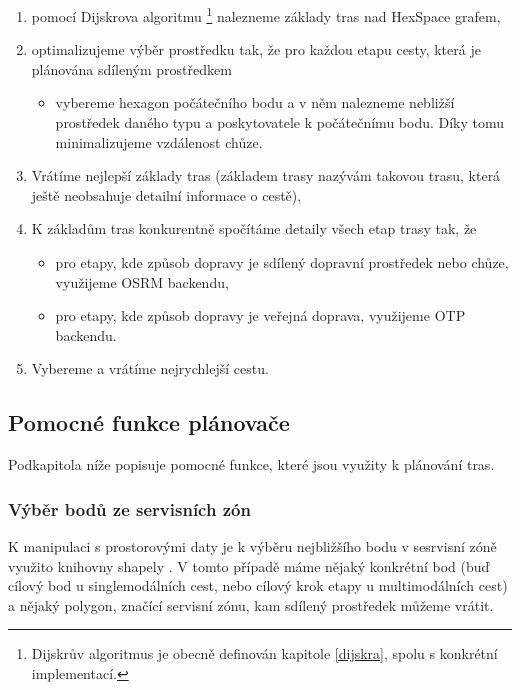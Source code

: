 \documentclass[thesis=M,czech]{FITthesis}[2019/12/23]
\theoremstyle{plain}
\theoremstyle{definition}
\begin{document}
\begin{enumerate}
	\item pomocí Dijskrova algoritmu \footnote{Dijskrův algoritmus je obecně definován kapitole \ref{dijskra}, spolu s konkrétní implementací.} nalezneme základy tras nad HexSpace grafem,

	\item optimalizujeme výběr prostředku tak, že pro každou etapu cesty, která je plánována sdíleným prostředkem
	\begin{itemize}
		\item vybereme hexagon počátečního bodu a v něm nalezneme nebližší prostředek daného typu a poskytovatele k počátečnímu bodu. Díky tomu minimalizujeme vzdálenost chůze.
	\end{itemize}
	\item Vrátíme nejlepší základy tras (základem trasy nazývám takovou trasu, která ještě neobsahuje detailní informace o cestě),
	\item K základům tras konkurentně spočítáme detaily všech etap trasy tak, že
	\begin{itemize}
		\item pro etapy, kde způsob dopravy je sdílený dopravní prostředek nebo chůze, využijeme OSRM backendu,
		\item pro etapy, kde způsob dopravy je veřejná doprava, využijeme OTP backendu.
	\end{itemize}
	\item Vybereme a vrátíme nejrychlejší cestu.
\end{enumerate}

\subsection{Pomocné funkce plánovače} 

Podkapitola níže popisuje pomocné funkce, které jsou využity k plánování tras.

\subsubsection{Výběr bodů ze servisních zón}\label{vyber-zon}

K manipulaci s prostorovými daty je k výběru nejbližšího bodu v sesrvisní zóně využito knihovny shapely \cite{shapely}. V tomto případě máme nějaký konkrétní bod (buď  cílový bod u singlemodálních cest, nebo cílový krok etapy u multimodálních cest) a nějaký polygon, značící servisní zónu, kam sdílený prostředek můžeme vrátit.
\end{document}
